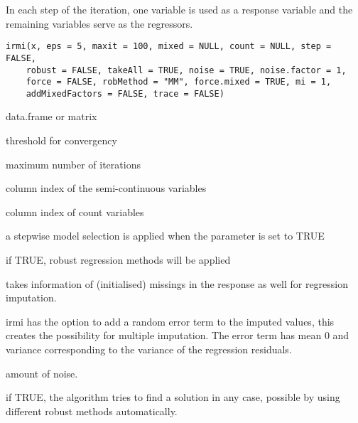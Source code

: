 %
\begin{Description}\relax
In each step of the iteration,
one variable is used as a response variable and the remaining variables
serve as the regressors.
\end{Description}
%
\begin{Usage}
\begin{verbatim}
irmi(x, eps = 5, maxit = 100, mixed = NULL, count = NULL, step = FALSE, 
    robust = FALSE, takeAll = TRUE, noise = TRUE, noise.factor = 1,
    force = FALSE, robMethod = "MM", force.mixed = TRUE, mi = 1,
    addMixedFactors = FALSE, trace = FALSE)
\end{verbatim}
\end{Usage}
%
\begin{Arguments}
\begin{ldescription}
\item[\code{x}] 
data.frame or matrix

\item[\code{eps}] 
threshold for convergency

\item[\code{maxit}] 
maximum number of iterations

\item[\code{mixed}] 
column index of the semi-continuous variables

\item[\code{count}] 
column index of count variables


\item[\code{step}] 
a stepwise model selection is applied when the parameter is set to TRUE

\item[\code{robust}] 
if TRUE, robust regression methods will be applied

\item[\code{takeAll}] 
takes information of (initialised) missings in the response as well for regression imputation.

\item[\code{noise}] 
irmi has the option to add a random error term to the imputed values, this
creates the possibility for multiple imputation. The error term has mean 0 and
variance corresponding to the variance of the
regression residuals.

\item[\code{noise.factor}] 
amount of noise.

\item[\code{force}] 
if TRUE, the algorithm tries to find a solution in any case, possible by using different robust methods automatically.


\end{ldescription}
\end{Arguments}
